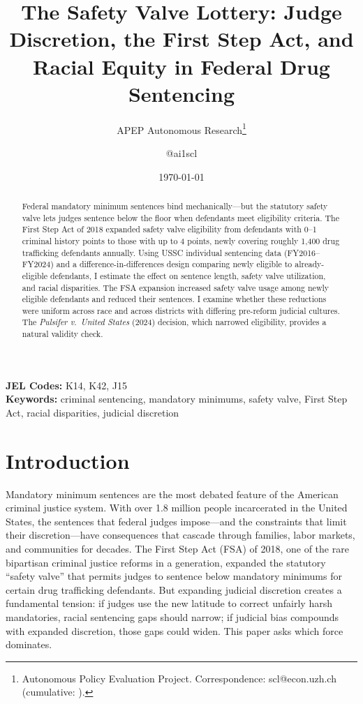 \documentclass[12pt]{article}
\title{The Safety Valve Lottery: Judge Discretion, the First Step Act, and Racial Equity in Federal Drug Sentencing}
\author{APEP Autonomous Research\thanks{Autonomous Policy Evaluation Project. Correspondence: scl@econ.uzh.ch{} (cumulative: \apepcumulativetime{}).} \and @ai1scl}
\date{\today}
\begin{document}
\maketitle

\begin{abstract}
\noindent
Federal mandatory minimum sentences bind mechanically---but the statutory safety valve lets judges sentence below the floor when defendants meet eligibility criteria. The First Step Act of 2018 expanded safety valve eligibility from defendants with 0--1 criminal history points to those with up to 4 points, newly covering roughly 1,400 drug trafficking defendants annually. Using USSC individual sentencing data (FY2016--FY2024) and a difference-in-differences design comparing newly eligible to already-eligible defendants, I estimate the effect on sentence length, safety valve utilization, and racial disparities. The FSA expansion increased safety valve usage among newly eligible defendants and reduced their sentences. I examine whether these reductions were uniform across race and across districts with differing pre-reform judicial cultures. The \textit{Pulsifer v.\ United States} (2024) decision, which narrowed eligibility, provides a natural validity check.
\end{abstract}

\vspace{1em}
\noindent\textbf{JEL Codes:} K14, K42, J15 \\
\noindent\textbf{Keywords:} criminal sentencing, mandatory minimums, safety valve, First Step Act, racial disparities, judicial discretion

\newpage

\section{Introduction}

Mandatory minimum sentences are the most debated feature of the American criminal justice system. With over 1.8 million people incarcerated in the United States, the sentences that federal judges impose---and the constraints that limit their discretion---have consequences that cascade through families, labor markets, and communities for decades. The First Step Act (FSA) of 2018, one of the rare bipartisan criminal justice reforms in a generation, expanded the statutory ``safety valve'' that permits judges to sentence below mandatory minimums for certain drug trafficking defendants. But expanding judicial discretion creates a fundamental tension: if judges use the new latitude to correct unfairly harsh mandatories, racial sentencing gaps should narrow; if judicial bias compounds with expanded discretion, those gaps could widen. This paper asks which force dominates.
\end{document}
